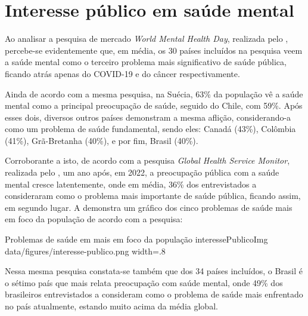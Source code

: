 \section{Interesse público em saúde mental}
\label{sec:interessePublico}

Ao analisar a pesquisa de mercado \textit{World Mental Health Day}, realizada pelo , percebe-se evidentemente que, em média, os 30 países incluídos na pesquisa veem a saúde mental como o terceiro problema mais significativo de saúde pública, ficando atrás apenas do COVID-19 e do câncer respectivamente.

Ainda de acordo com a mesma pesquisa, na Suécia, 63\% da população vê a saúde mental como a principal preocupação de saúde, seguido do Chile, com 59\%. Após esses dois, diversos outros países demonstram a mesma aflição, considerando-a como um problema de saúde fundamental, sendo eles: Canadá (43\%), Colômbia (41\%), Grã-Bretanha (40\%), e por fim, Brasil (40\%).

Corroborante a isto, de acordo com a pesquisa \textit{Global Health Service Monitor}, realizada pelo , um ano após, em 2022, a preocupação pública com a saúde mental cresce latentemente, onde em média, 36\% dos entrevistados a consideraram como o problema mais importante de saúde pública, ficando assim, em segundo lugar. A  demonstra um gráfico dos cinco problemas de saúde mais em foco da população de acordo com a pesquisa:

\image
    {Problemas de saúde em mais em foco da população}
    {interessePublicoImg}
    {data/figures/interesse-publico.png}
    {width=.8\textwidth}
    {}

Nessa mesma pesquisa constata-se também que dos 34 países incluídos, o Brasil é o sétimo país que mais relata preocupação com saúde mental, onde 49\% dos brasileiros entrevistados a consideram como o problema de saúde mais enfrentado no país atualmente, estando muito acima da média global.

